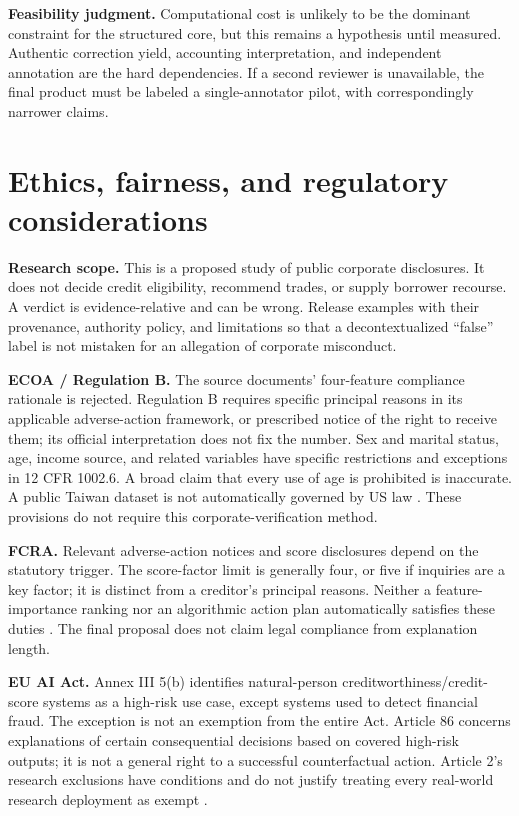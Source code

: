 \documentclass[11pt,a4paper]{article}
\newcommand{\pbreak}{\clearpage}
\newcommand{\lead}[1]{\textbf{\color{navy}#1}}
\begin{document}
\lead{Feasibility judgment.} Computational cost is unlikely to be the dominant constraint for the structured core, but this remains a hypothesis until measured. Authentic correction yield, accounting interpretation, and independent annotation are the hard dependencies. If a second reviewer is unavailable, the final product must be labeled a single-annotator pilot, with correspondingly narrower claims.

\pbreak
\section{Ethics, fairness, and regulatory considerations}
\lead{Research scope.} This is a proposed study of public corporate disclosures. It does not decide credit eligibility, recommend trades, or supply borrower recourse. A verdict is evidence-relative and can be wrong. Release examples with their provenance, authority policy, and limitations so that a decontextualized “false” label is not mistaken for an allegation of corporate misconduct.

\lead{ECOA / Regulation B.} The source documents' four-feature compliance rationale is rejected. Regulation B requires specific principal reasons in its applicable adverse-action framework, or prescribed notice of the right to receive them; its official interpretation does not fix the number. Sex and marital status, age, income source, and related variables have specific restrictions and exceptions in 12 CFR 1002.6. A broad claim that every use of age is prohibited is inaccurate. A public Taiwan dataset is not automatically governed by US law \cite{regb}. These provisions do not require this corporate-verification method.

\lead{FCRA.} Relevant adverse-action notices and score disclosures depend on the statutory trigger. The score-factor limit is generally four, or five if inquiries are a key factor; it is distinct from a creditor's principal reasons. Neither a feature-importance ranking nor an algorithmic action plan automatically satisfies these duties \cite{fcra,regb,barocas}. The final proposal does not claim legal compliance from explanation length.

\lead{EU AI Act.} Annex III 5(b) identifies natural-person creditworthiness/credit-score systems as a high-risk use case, except systems used to detect financial fraud. The exception is not an exemption from the entire Act. Article 86 concerns explanations of certain consequential decisions based on covered high-risk outputs; it is not a general right to a successful counterfactual action. Article 2's research exclusions have conditions and do not justify treating every real-world research deployment as exempt \cite{aiact}.
\end{document}
